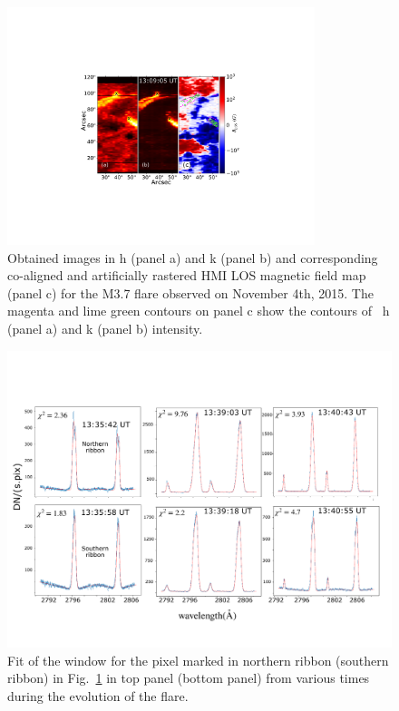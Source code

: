 \begin{figure}[h!]
\centering  
\includegraphics[trim={7cm 5cm 6cm 10cm},width=0.8\textwidth]{Figures/m_flare_iris.pdf}
\caption{Obtained images in   h (panel a) and k (panel b) and corresponding co-aligned and artificially rastered HMI LOS magnetic field map (panel c) for the M3.7 flare observed on November 4th, 2015. The magenta and lime green contours on panel c show the contours of  ~h (panel a) and k (panel b) intensity.} \label{fig:aligned_raster}
\end{figure}

\begin{figure}[ht!]
    \centering
    \includegraphics[trim={0cm 3cm 0.5cm 3cm},clip,width=\textwidth]{Figures/pix_fit.pdf}
    \caption{Fit of the   window for the pixel marked in northern ribbon (southern ribbon) in Fig.~\ref{fig:aligned_raster} in top panel (bottom panel) from various times during the evolution of the flare. }
    \label{fig:pix_fit_ribbon}
\end{figure}

